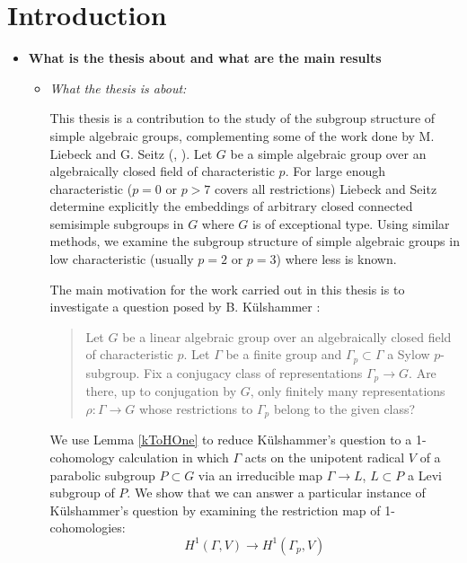 
\chapter{Introduction}
\label{Chapter1}

\begin{itemize}
	\item[] \textbf{What is the thesis about and what are the main results}
	\begin{itemize}
		\item \emph{What the thesis is about:}
	
		This thesis is a contribution to the study of the subgroup structure of simple algebraic groups, complementing some of the work done by M. Liebeck and G. Seitz (\cite{liebeck1996reductive}, \cite{liebeck2004maximal}). Let $G$ be a simple algebraic group over an algebraically closed field of characteristic $p$. For large enough characteristic ($p=0$ or $p>7$ covers all restrictions) Liebeck and Seitz determine explicitly the embeddings of arbitrary closed connected semisimple subgroups in $G$ where $G$ is of exceptional type. Using similar methods, we examine the subgroup structure of simple algebraic groups in low characteristic (usually $p=2$ or $p=3$) where less is known.
		
		
		The main motivation for the work carried out in this thesis is to investigate a question posed by B. K\"ulshammer \cite{weil1964remarks}:
		\begin{quote}
		Let $G$ be a linear algebraic group over an algebraically closed field of characteristic $p$. Let $\Gamma$ be a finite group and $\Gamma_p\subset\Gamma$ a Sylow $p$-subgroup. Fix a conjugacy class of representations $\Gamma_p\rightarrow G$. Are there, up to conjugation by $G$, only finitely many representations $\rho:\Gamma\rightarrow G$ whose restrictions to $\Gamma_p$ belong to the given class?
		\end{quote}
		
		
		We use Lemma \ref{kToHOne} to reduce K\"ulshammer's question to a 1-cohomology calculation in which $\Gamma$ acts on the unipotent radical $V$ of a parabolic subgroup $P \subset G$ via an irreducible map $\Gamma \rightarrow L$, $L \subset P$ a Levi subgroup of $P$. We show that we can answer a particular instance of K\"ulshammer's question by examining the restriction map of 1-cohomologies:
		\begin{displaymath}
			H^1(\Gamma, V) \rightarrow H^1(\Gamma_p, V)
		\end{displaymath}
		

\end{itemize}
\end{itemize}
